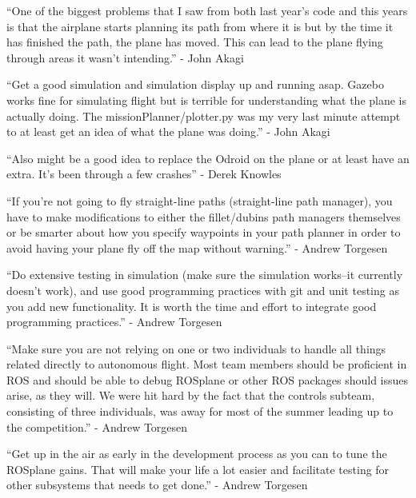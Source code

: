 {}

{``One of the biggest problems that I saw from both last year's code and
this years is that the airplane starts planning its path from where it
is but by the time it has finished the path, the plane has moved. This
can lead to the plane flying through areas it wasn't intending.'' - John
Akagi}

{}

{``Get a good simulation and simulation display up and running asap.
Gazebo works fine for simulating flight but is terrible for
understanding what the plane is actually doing. The
missionPlanner/plotter.py was my very last minute attempt to at least
get an idea of what the plane was doing.'' - John Akagi}

{}

{``Also might be a good idea to replace the Odroid on the plane or at
least have an extra. It's been through a few crashes'' - Derek Knowles}

{}

{``If you're not going to fly straight-line paths (straight-line path
manager), you have to make modifications to either the fillet/dubins
path managers themselves or be smarter about how you specify waypoints
in your path planner in order to avoid having your plane fly off the map
without warning.'' - Andrew Torgesen}

{}

{``Do extensive testing in simulation (make sure the simulation
works--it currently doesn't work), and use good programming practices
with git and unit testing as you add new functionality. It is worth the
time and effort to integrate good programming practices.'' - Andrew
Torgesen}

{}

{``Make sure you are not relying on one or two individuals to handle all
things related directly to autonomous flight. Most team members should
be proficient in ROS }{and should be able to debug ROSplane or other ROS
packages should issues arise}{, as they will. We were hit hard by the
fact that the controls subteam, consisting of three individuals, was
away for most of the summer leading up to the competition.'' - Andrew
Torgesen}

{}

{``Get up in the air as early in the development process as you can to
tune the ROSplane gains. That will make your life a lot easier and
facilitate testing for other subsystems that needs to get done.'' -
Andrew Torgesen}

